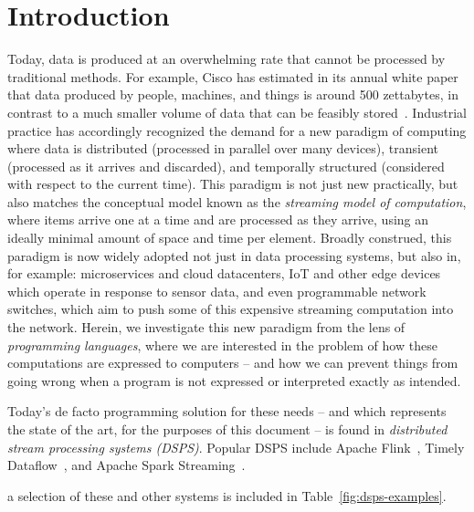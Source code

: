 \section{Introduction}
\label{sec:intro}

Today, data is produced at an overwhelming rate
that cannot be processed by traditional methods.
For example, Cisco has estimated in its annual white paper
that data produced by people, machines, and things
is around 500 zettabytes, in contrast to a much smaller volume
of data that can be feasibly stored~\cite{index2018forecast}.
Industrial practice has accordingly recognized the demand
for a new paradigm of computing
where data is
distributed (processed in parallel over many devices),
transient (processed as it arrives and discarded),
and temporally structured (considered with respect to the current time).
This paradigm is not just new practically, but also matches the conceptual
model known as the \emph{streaming model of computation},
where items arrive one at a time and are processed as they arrive, using
an ideally minimal amount of space and time per element.
Broadly construed, this paradigm is now widely adopted not just in
data processing systems, but also in, for example: microservices and
cloud datacenters, IoT and other edge devices which operate in response
to sensor data, and even programmable network switches,
which aim to push some of this expensive streaming computation
into the network.
Herein, we investigate this new paradigm from the lens of \emph{programming languages}, where we are interested in the problem of how these computations are expressed to computers -- and how we can prevent things from going wrong when a program is not expressed or interpreted exactly as intended.

Today's de facto programming solution for these needs -- and which represents the state of the art, for the purposes of this document --
is found in \emph{distributed stream processing systems (DSPS)}.
Popular DSPS include
Apache Flink~\cite{Flink,Flink2015},
Timely Dataflow~\cite{Timely,Naiad2013},
and Apache Spark Streaming~\cite{SparkStreaming,Spark2013}.


a selection of these and other systems is included in Table~\ref{fig:dsps-examples}.


